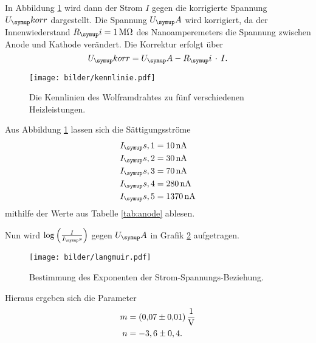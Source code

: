 In Abbildung \ref{fig:kenn} wird dann der Strom $I$ gegen die korrigierte Spannung $U_\su{korr}$
dargestellt. Die Spannung $U_\su{A}$ wird korrigiert, da der Innenwiederstand
$R_\su{i} = \SI{1}{\mega\ohm}$ des Nanoamperemeters die Spannung zwischen
Anode und Kathode verändert. Die Korrektur erfolgt über
\begin{equation}
  U_\su{korr} = U_\su{A}-R_\su{i}\,\cdot\, I. \\
\end{equation}
\begin{figure}[H]
  \centering
  \texttt{[image: bilder/kennlinie.pdf]}
  \caption{Die Kennlinien des Wolframdrahtes zu fünf verschiedenen Heizleistungen.}
  \label{fig:kenn}
\end{figure}
Aus Abbildung \ref{fig:kenn} lassen sich die Sättigungsströme
\begin{align*}
  I_\su{s,1} &= \SI{10}{\nano\ampere}  \\
  I_\su{s,2} &= \SI{30}{\nano\ampere} \\
  I_\su{s,3} &= \SI{70}{\nano\ampere}  \\
  I_\su{s,4} &= \SI{280}{\nano\ampere}  \\
  I_\su{s,5} &= \SI{1370}{\nano\ampere}  \\
\end{align*}
mithilfe der Werte aus Tabelle \ref{tab:anode} ablesen.

Nun wird $\log{\left(\frac{I}{I_\su{s}}\right)}$ gegen $U_\su{A}$ in Grafik \ref{fig:langmuir}
aufgetragen.
\begin{figure}
  \centering
  \texttt{[image: bilder/langmuir.pdf]}
  \caption{Bestimmung des Exponenten der Strom-Spannungs-Beziehung.}
  \label{fig:langmuir}
\end{figure}
Hieraus ergeben sich die Parameter
\begin{align*}
  m &= \SI[per-mode=fraction]{0,07\pm0,01}{\per\volt} \\
  n &= -3,6\pm0,4. \\
\end{align*}
